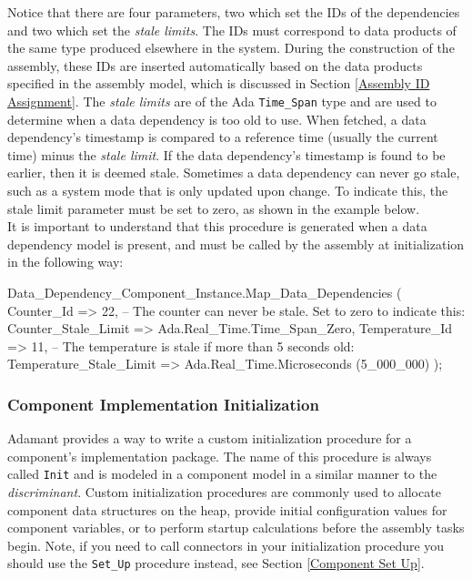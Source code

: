 Notice that there are four parameters, two which set the IDs of the dependencies and two which set the \textit{stale limits}. The IDs must correspond to data products of the same type produced elsewhere in the system. During the construction of the assembly, these IDs are inserted automatically based on the data products specified in the assembly model, which is discussed in Section \ref{Assembly ID Assignment}.  The \textit{stale limits} are of the Ada \texttt{Time\_Span} type and are used to determine when a data dependency is too old to use. When fetched, a data dependency's timestamp is compared to a reference time (usually the current time) minus the \textit{stale limit}. If the data dependency's timestamp is found to be earlier, then it is deemed stale. Sometimes a data dependency can never go stale, such as a system mode that is only updated upon change. To indicate this, the stale limit parameter must be set to zero, as shown in the example below. \\

It is important to understand that this procedure is generated when a data dependency model is present, and must be called by the assembly at initialization in the following way:

\vspace{5mm} %
\begin{adacode}
  Data_Dependency_Component_Instance.Map_Data_Dependencies (
    Counter_Id => 22,
    -- The counter can never be stale. Set to zero to indicate this:
    Counter_Stale_Limit => Ada.Real_Time.Time_Span_Zero,
    Temperature_Id => 11,
    -- The temperature is stale if more than 5 seconds old:
    Temperature_Stale_Limit => Ada.Real_Time.Microseconds (5_000_000)
  );
\end{adacode}
\vspace{5mm} %

\subsubsection{Component Implementation Initialization} \label{Component Implementation Initialization}

Adamant provides a way to write a custom initialization procedure for a component's implementation package. The name of this procedure is always called \texttt{Init} and is modeled in a component model in a similar manner to the \textit{discriminant}. Custom initialization procedures are commonly used to allocate component data structures on the heap, provide initial configuration values for component variables, or to perform startup calculations before the assembly tasks begin. Note, if you need to call connectors in your initialization procedure you should use the \texttt{Set\_Up} procedure instead, see Section \ref{Component Set Up}. \\

